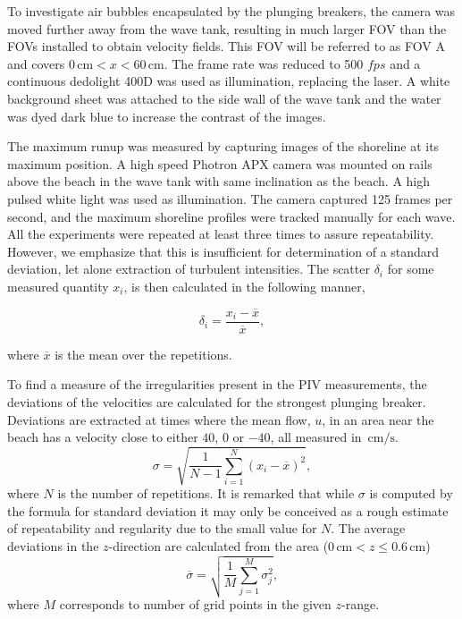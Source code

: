 \documentclass[review, authoryear]{elsarticle}
\newcommand{\cm}{\,\mbox{cm}}
\newcommand{\cmps}{\,\mbox{cm/s}}
\begin{document}
To investigate air bubbles encapsulated by the plunging breakers, the camera was moved further away from the wave tank, resulting in much larger FOV than the FOVs installed to obtain velocity fields. This FOV will be referred to as FOV A and covers $0\cm< x <60\cm$. The frame rate was reduced to  500 $fps$  
and a continuous dedolight 400D was used as illumination, replacing the laser. A white background sheet was attached to the side wall of the wave tank and the water was dyed dark blue to increase the contrast of the images.

The maximum runup was measured by capturing images of the shoreline at its maximum position. A high speed Photron APX  camera was mounted on rails above the beach in the wave tank with same inclination as the beach. A high pulsed white light was used as illumination. The camera captured 125 frames per second, and the maximum shoreline profiles were tracked manually for each wave. All the experiments were repeated at least three times to assure repeatability. However,
we emphasize that this is insufficient for determination of a standard deviation, let alone extraction of turbulent intensities.  
The scatter $\delta_i$ for some measured quantity $x_i$, is then calculated in the following manner,

\begin{equation}
\delta_i=\frac{x_i-\overline{x}}{\overline{x}},
\end{equation}

where $\overline{x}$ is the mean over the repetitions.


To find a measure of the irregularities present in the PIV measurements, the  deviations of the velocities are calculated for the strongest plunging breaker. Deviations are extracted at times where the mean flow, $u$, in an area near the beach has a velocity close to either
$40$, $0$ or $-40$, all measured in $\cmps$.
\begin{equation}
\sigma=\sqrt{\frac{1}{N-1}\sum_{i=1}^{N}(x_i-\overline{x})^2}, 
\end{equation}
where $N$ is the number of repetitions. It is remarked that while $\sigma$ 
 is  computed by the formula for standard deviation it may only be conceived as
a rough estimate of repeatability and regularity due to the small value for
$N$.
The average deviations in the $z$-direction are calculated from the area ($0\cm < z \le 0.6\cm$)
\begin{equation}
\overline{\sigma}=\sqrt{\frac{1}{M}\sum_{j=1}^{M}\sigma_j^2},
\label{av_g}
\end{equation}
where $M$ corresponds to number of  grid points in the given $z$-range.
\end{document}
